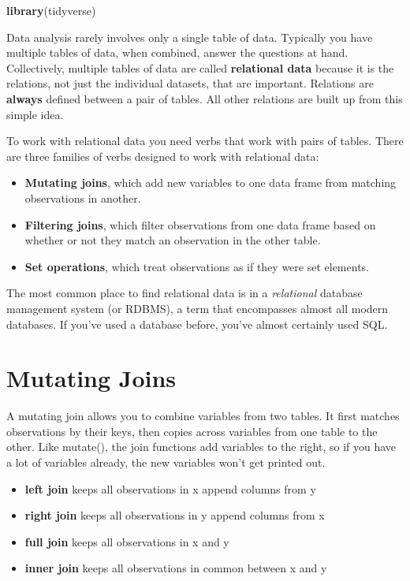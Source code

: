 \documentclass[]{book}
\newenvironment{Shaded}{\begin{snugshade}}{\end{snugshade}}
\newcommand{\KeywordTok}[1]{\textcolor[rgb]{0.13,0.29,0.53}{\textbf{#1}}}
\newcommand{\NormalTok}[1]{#1}
\providecommand{\tightlist}{%
  \setlength{\itemsep}{0pt}\setlength{\parskip}{0pt}}
\theoremstyle{definition}
\theoremstyle{definition}
\theoremstyle{definition}
\theoremstyle{remark}
\begin{document}
\begin{Shaded}
\begin{Highlighting}[]
\KeywordTok{library}\NormalTok{(tidyverse)}
\end{Highlighting}
\end{Shaded}

Data analysis rarely involves only a single table of data. Typically you
have multiple tables of data, when combined, answer the questions at
hand. Collectively, multiple tables of data are called
\textbf{relational data} because it is the relations, not just the
individual datasets, that are important. Relations are \textbf{always}
defined between a pair of tables. All other relations are built up from
this simple idea.

To work with relational data you need verbs that work with pairs of
tables. There are three families of verbs designed to work with
relational data:

\begin{itemize}
\item
  \textbf{Mutating joins}, which add new variables to one data frame
  from matching observations in another.
\item
  \textbf{Filtering joins}, which filter observations from one data
  frame based on whether or not they match an observation in the other
  table.
\item
  \textbf{Set operations}, which treat observations as if they were set
  elements.
\end{itemize}

The most common place to find relational data is in a \emph{relational}
database management system (or RDBMS), a term that encompasses almost
all modern databases. If you've used a database before, you've almost
certainly used SQL.

\section{Mutating Joins}\label{mutating-joins}

A mutating join allows you to combine variables from two tables. It
first matches observations by their keys, then copies across variables
from one table to the other. Like mutate(), the join functions add
variables to the right, so if you have a lot of variables already, the
new variables won't get printed out.

\begin{itemize}
\tightlist
\item
  \textbf{left join} keeps all observations in x append columns from y
\item
  \textbf{right join} keeps all observations in y append columns from x
\item
  \textbf{full join} keeps all observations in x and y
\item
  \textbf{inner join} keeps all observations in common between x and y
\end{itemize}
\end{document}

